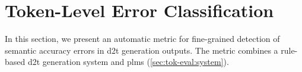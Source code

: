 \documentclass[12pt,notitlepage,a4paper,oneside,openany]{report}
\renewcommand\cite{\citep}
\begin{document}


\section{Token-Level Error Classification}
\label{sec:tok-eval}

In this section, we present an automatic metric for fine-grained detection of semantic accuracy errors in \ac{d2t} generation outputs. The metric combines a rule-based \ac{d2t} generation system and \acp{plm} (\autoref{sec:tok-eval:system}).


\end{document}
